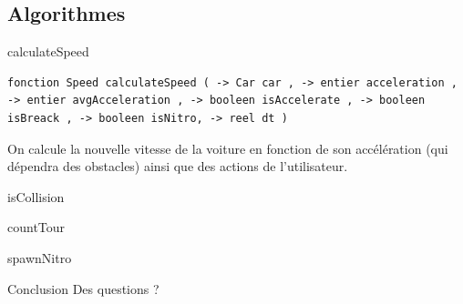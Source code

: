 \documentclass[10pt,dvipsnames,final]{beamer}
\begin{document}
\subsection{Algorithmes}

\begin{frame}[fragile]{calculateSpeed}
\begin{lstlisting}[language=pdl]
fonction Speed calculateSpeed ( -> Car car , -> entier acceleration , -> entier avgAcceleration , -> booleen isAccelerate , -> booleen isBreack , -> booleen isNitro, -> reel dt )
\end{lstlisting}

On calcule la nouvelle vitesse de la voiture en fonction de son accélération (qui dépendra des obstacles) ainsi que des actions de l'utilisateur.
\end{frame}

\begin{frame}{isCollision}

\end{frame}

\begin{frame}{countTour}

\end{frame}

\begin{frame}{spawnNitro}

\end{frame}

\begin{frame}{Conclusion}
\Huge\centering
Des questions ?
\end{frame}
\end{document}
